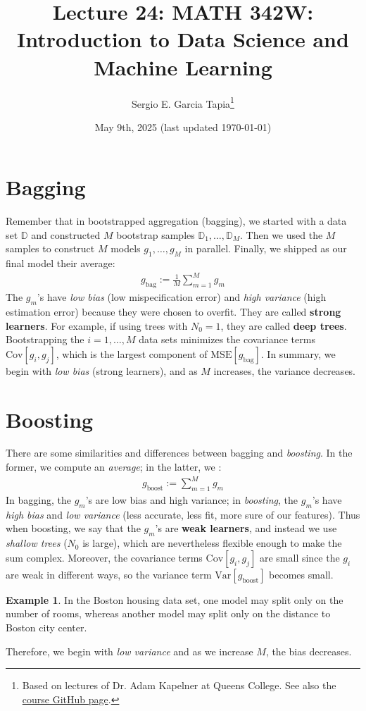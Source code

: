 \documentclass[12pt, a4paper]{article}
\title{Lecture 24: MATH 342W: Introduction to Data Science and Machine Learning}
\author{Sergio E. Garcia Tapia\thanks{Based on lectures of Dr. Adam Kapelner at Queens College.
See also the \href{https://github.com/kapelner/QC_MATH_342W_Spring_2025}{course GitHub page}.}}
\date{May 9th, 2025 (last updated \today)}
\theoremstyle{definition}
\newtheorem*{example}{Example}
\begin{document}
	\maketitle
	\section{Bagging}
	Remember that in bootstrapped aggregation (bagging), we started
	with a data set $\mathbb{D}$ and constructed $M$ bootstrap samples
	$\mathbb{D}_1,\ldots,\mathbb{D}_M$. Then we used the $M$ samples
	to construct $M$ models $g_1,\ldots,g_M$ in parallel. Finally,
	we shipped as our final model their average:
	\begin{align*}
		g_{\text{bag}} := \frac{1}{M}\sum_{m=1}^{M}g_m
	\end{align*}
	The $g_m$'s have \textit{low bias} (low mispecification error) and
	\textit{high variance} (high estimation error) because they were chosen
	to overfit. They are called \textbf{strong learners}. For example,
	if using trees with $N_0 = 1$, they are called \textbf{deep trees}.
	Bootstrapping the $i=1,\ldots,M$ data sets minimizes the covariance terms
	$\text{Cov}[g_i, g_j]$, which is the largest component of $\text{MSE}[g_{\text{bag}}]$.
	In summary, we begin with \textit{low bias} (strong learners), and as $M$
	increases, the variance decreases.
	\section{Boosting}
	There are some similarities and differences between bagging and \textit{boosting}.
	In the former, we compute an \textit{average}; in the latter, we :
	\begin{align*}
		g_{\text{boost}} := \sum_{m=1}^{M}g_m
	\end{align*}
	In bagging, the $g_m$'s are low bias and high variance; in \textit{boosting},
	the $g_m$'s have \textit{high bias} and \textit{low variance} (less accurate,
	less fit, more sure of our features). Thus when boosting, we say that the $g_m$'s
	are \textbf{weak learners}, and instead we use \textit{shallow trees} ($N_0$ is large),
	which are nevertheless flexible enough to make the sum complex. Moreover,
	the covariance terms $\text{Cov}[g_i, g_j]$ are small since the $g_i$ are weak
	in different ways, so the variance term $\text{Var}[g_{\text{boost}}]$ becomes small.
	\begin{tcolorbox}[breakable]
		\begin{example}
			In the Boston housing data set, one model may split only on 
			the number of rooms, whereas another model may split only on
			the distance to Boston city center.
		\end{example}
	\end{tcolorbox}
	Therefore, we begin with \textit{low variance} and as we increase $M$,
	the bias decreases.
	
\end{document}
